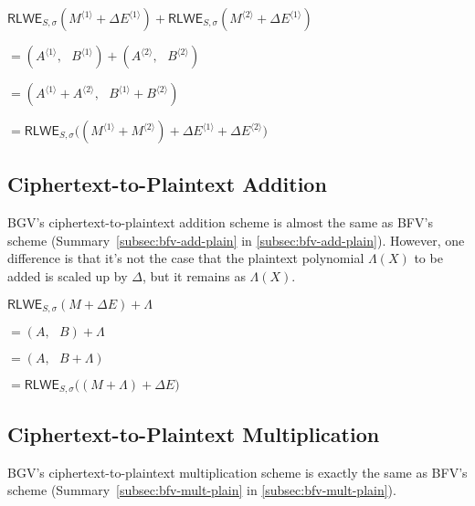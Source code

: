 \begin{tcolorbox}[title={\textbf{\tboxlabel{\ref*{subsec:bgv-add-cipher}} BGV Ciphertext-to-Ciphertext Addition}}]
$\textsf{RLWE}_{S, \sigma}(M^{\langle 1 \rangle} + \Delta E^{\langle 1 \rangle} ) + \textsf{RLWE}_{S, \sigma}(M^{\langle 2 \rangle} + \Delta E^{\langle 1 \rangle}) $

$ = ( A^{\langle 1 \rangle}, \text{ } B^{\langle 1 \rangle}) + (A^{\langle 2 \rangle}, \text{ } B^{\langle 2 \rangle}) $

$ = ( A^{\langle 1 \rangle} + A^{\langle 2 \rangle}, \text{ } B^{\langle 1 \rangle} + B^{\langle 2 \rangle} ) $

$= \textsf{RLWE}_{S, \sigma}\bm((M^{\langle 1 \rangle} + M^{\langle 2 \rangle})  + \Delta E^{\langle 1 \rangle} + \Delta E^{\langle 2 \rangle} \bm)$
\end{tcolorbox}

\subsection{Ciphertext-to-Plaintext Addition}
\label{subsec:bgv-add-plain}

BGV's ciphertext-to-plaintext addition scheme is almost the same as BFV's scheme (Summary~\ref*{subsec:bfv-add-plain} in \autoref{subsec:bfv-add-plain}). However, one difference is that it's not the case that the plaintext polynomial $\Lambda(X)$ to be added is scaled up by $\Delta$, but it remains as $\Lambda(X)$.

\begin{tcolorbox}[title={\textbf{\tboxlabel{\ref*{subsec:bgv-add-plain}} BGV Ciphertext-to-Plaintext Addition}}]
$\textsf{RLWE}_{S, \sigma}(M + \Delta E) + \Lambda $

$=  (A, \text{ } B) + \Lambda$

$=  (A, \text{ } B + \Lambda)$

$= \textsf{RLWE}_{S, \sigma}\bm((M + \Lambda) + \Delta E \bm)$
\end{tcolorbox}


\subsection{Ciphertext-to-Plaintext Multiplication}
\label{subsec:bgv-mult-plain}




BGV's ciphertext-to-plaintext multiplication scheme is exactly the same as BFV's scheme (Summary~\ref*{subsec:bfv-mult-plain} in \autoref{subsec:bfv-mult-plain}). 


